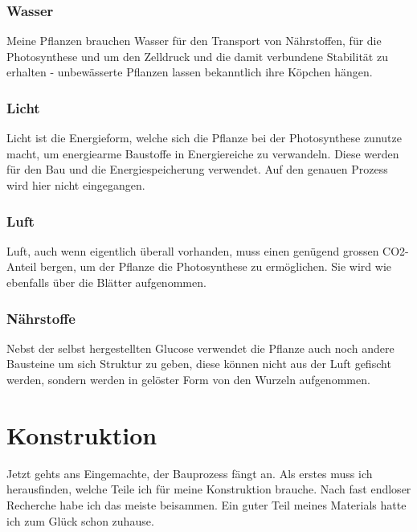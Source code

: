 \documentclass[12pt,titlepage,a4paper]{article}
\begin{document}
\subsubsection{Wasser}
Meine Pflanzen brauchen Wasser für den Transport von Nährstoffen, für die Photosynthese und um den Zelldruck und die damit verbundene Stabilität zu erhalten - unbewässerte Pflanzen lassen bekanntlich ihre Köpchen hängen.


\subsubsection{Licht}
Licht ist die Energieform, welche sich die Pflanze bei der Photosynthese zunutze macht, um energiearme Baustoffe in Energiereiche zu verwandeln. Diese werden für den Bau und die Energiespeicherung verwendet. Auf den genauen Prozess wird hier nicht eingegangen.

\subsubsection{Luft}
Luft, auch wenn eigentlich überall vorhanden, muss einen genügend grossen CO2-Anteil bergen, um der Pflanze die Photosynthese zu ermöglichen. Sie wird wie ebenfalls über die Blätter aufgenommen.

\subsubsection{Nährstoffe}
Nebst der selbst hergestellten Glucose verwendet die Pflanze auch noch andere Bausteine um sich Struktur zu geben, diese können nicht aus der Luft gefischt werden, sondern werden in gelöster Form von den Wurzeln aufgenommen.







\section{Konstruktion}
Jetzt gehts ans Eingemachte, der Bauprozess fängt an. Als erstes muss ich herausfinden, welche Teile ich für meine Konstruktion brauche. Nach fast endloser Recherche habe ich das meiste beisammen. Ein guter Teil meines Materials hatte ich zum Glück schon zuhause.
\end{document}
